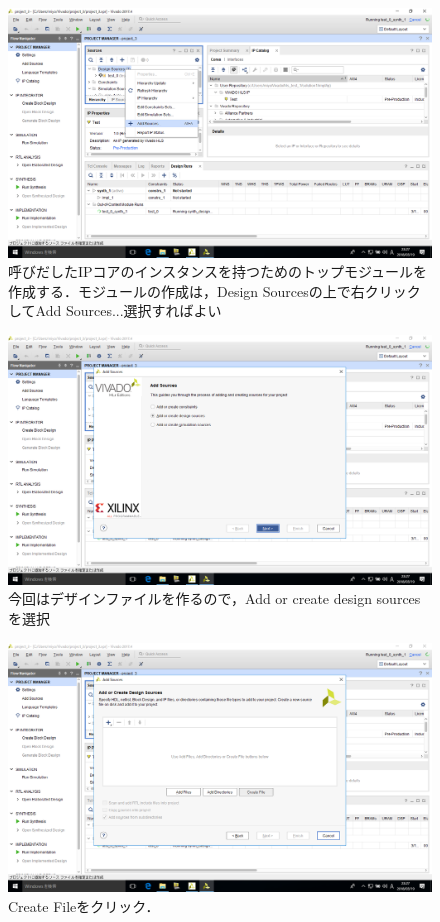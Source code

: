 \documentclass[a4paper,dvipdfmx]{jsarticle}
\begin{document}
 \begin{figure}[H]
  \begin{center}
   \includegraphics[width=.8\textwidth]{chapter08_figures/VirtualBox_Windows10_19_03_2018_23_27_29.png}
  \end{center}
  \caption{呼びだしたIPコアのインスタンスを持つためのトップモジュールを作成する．モジュールの作成は，Design Sourcesの上で右クリックしてAdd Sources...選択すればよい}
 \end{figure}

 \begin{figure}[H]
  \begin{center}
   \includegraphics[width=.8\textwidth]{chapter08_figures/VirtualBox_Windows10_19_03_2018_23_27_35.png}
  \end{center}
  \caption{今回はデザインファイルを作るので，Add or create design sourcesを選択}
 \end{figure}

 \begin{figure}[H]
  \begin{center}
   \includegraphics[width=.8\textwidth]{chapter08_figures/VirtualBox_Windows10_19_03_2018_23_27_41.png}
  \end{center}
  \caption{Create Fileをクリック．}
 \end{figure}
\end{document}
